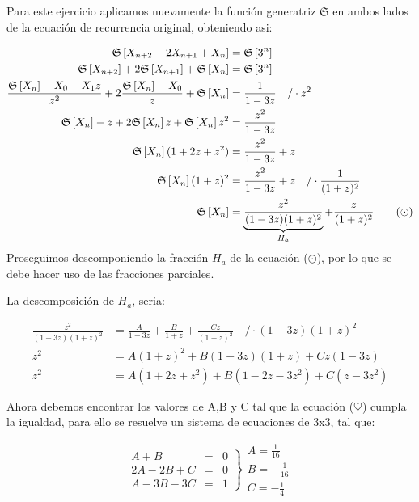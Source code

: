 Para este ejercicio aplicamos nuevamente la función generatriz $\mathfrak{S}$  en ambos lados de la ecuación de recurrencia original, obteniendo asi:

\begin{align*}
    \mathfrak{S}\left[ X_{n+2} + 2X_{n+1} + X_n \right] &= \mathfrak{S}\left[ 3^n \right]\\
    \mathfrak{S}\left[ X_{n+2} \right] + 2\mathfrak{S}\left[ X_{n+1} \right] + \mathfrak{S}\left[ X_n \right] &= \mathfrak{S}\left[ 3^n \right]\\
    \frac{\mathfrak{S}\left[ X_n \right]-X_0-X_1z}{z^2} +2\frac{\mathfrak{S}\left[ X_n \right]-X_0}{z} + \mathfrak{S}\left[ X_n \right] &= \frac{1}{1-3z}\quad\text{/}\cdot z^2\\
    \mathfrak{S}\left[ X_n \right] - z +2\mathfrak{S}\left[ X_n \right]z + \mathfrak{S}\left[ X_n \right]z^2 &= \frac{z^2}{1-3z}\\
    \mathfrak{S}\left[ X_n \right](1+2z+z^2)&=\frac{z^2}{1-3z} +z\\
    \mathfrak{S}\left[ X_n \right](1+z)^2 &= \frac{z^2}{1-3z}+z\quad\text{/}\cdot\frac{1}{(1+z)^2}\\
    \mathfrak{S}\left[ X_n \right]&= \underbrace{ \frac{z^2}{(1-3z)(1+z)^2}}_{H_a} + \frac{z}{(1+z)^2} \tag{$\odot$}
\end{align*}
Proseguimos descomponiendo la fracción $H_a$  de la ecuación ($\odot$), por lo que se debe hacer uso de las fracciones parciales.

La descomposición de $H_a$, seria:

\begin{align*}
    \frac{z^2}{(1-3z)(1+z)^2} &= \frac{A}{1-3z} + \frac{B}{1+z} + \frac{Cz}{(1+z)^2}\quad\text{/}\cdot(1-3z)(1+z)^2\\
    z^2 &= A(1+z)^2 + B(1-3z)(1+z) +Cz(1-3z)\\
    z^2 &= A(1+2z+z^2) + B(1-2z-3z^2)+C(z-3z^2) \tag{$\heartsuit$}
\end{align*}

Ahora debemos encontrar los valores de A,B y C tal que la ecuación ($\heartsuit$) cumpla la igualdad, para ello se resuelve un sistema de ecuaciones de 3x3, tal que:

$$
    \left.
      \begin{array}{rcr}
       A + B &=& 0\\
      2A -2B +C &=& 0 \\
      A - 3B - 3C &=& 1
      \end{array}
    \right\}
    \begin{array}{l}
       A= \frac{1}{16} \\
       B= -\frac{1}{16} \\
       C= -\frac{1}{4}
    \end{array}
$$

